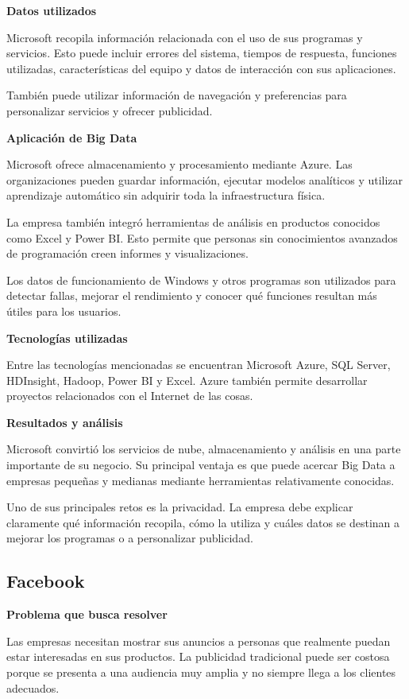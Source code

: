 \textbf{Datos utilizados}

Microsoft recopila información relacionada con el uso de sus programas y servicios. Esto puede incluir errores del sistema, tiempos de respuesta, funciones utilizadas, características del equipo y datos de interacción con sus aplicaciones.

También puede utilizar información de navegación y preferencias para personalizar servicios y ofrecer publicidad.

\textbf{Aplicación de Big Data}

Microsoft ofrece almacenamiento y procesamiento mediante Azure. Las organizaciones pueden guardar información, ejecutar modelos analíticos y utilizar aprendizaje automático sin adquirir toda la infraestructura física.

La empresa también integró herramientas de análisis en productos conocidos como Excel y Power BI. Esto permite que personas sin conocimientos avanzados de programación creen informes y visualizaciones.

Los datos de funcionamiento de Windows y otros programas son utilizados para detectar fallas, mejorar el rendimiento y conocer qué funciones resultan más útiles para los usuarios.

\textbf{Tecnologías utilizadas}

Entre las tecnologías mencionadas se encuentran Microsoft Azure, SQL Server, HDInsight, Hadoop, Power BI y Excel. Azure también permite desarrollar proyectos relacionados con el Internet de las cosas.

\textbf{Resultados y análisis}

Microsoft convirtió los servicios de nube, almacenamiento y análisis en una parte importante de su negocio. Su principal ventaja es que puede acercar Big Data a empresas pequeñas y medianas mediante herramientas relativamente conocidas.

Uno de sus principales retos es la privacidad. La empresa debe explicar claramente qué información recopila, cómo la utiliza y cuáles datos se destinan a mejorar los programas o a personalizar publicidad.

\subsection{Facebook}

\textbf{Problema que busca resolver}

Las empresas necesitan mostrar sus anuncios a personas que realmente puedan estar interesadas en sus productos. La publicidad tradicional puede ser costosa porque se presenta a una audiencia muy amplia y no siempre llega a los clientes adecuados.

